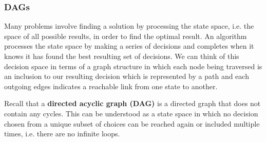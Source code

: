 \documentclass{article}
\begin{document}
       \subsubsection{DAGs}
    
    Many problems involve finding a solution by processing the state space, i.e. the space of all possible results, in order to find the optimal result. An algorithm processes the state space by making a series of decisions and completes when it knows it has found the best resulting set of decisions. We can think of this decision space in terms of a graph structure in which each node being traversed is an inclusion to our resulting decision which is represented by a path and each outgoing edges indicates a reachable link from one state to another. 
    
    Recall that a \textbf{directed acyclic graph (DAG)} is a directed graph that does not contain any cycles. This can be understood as a state space in which no decision chosen from a unique subset of choices can be reached again or included multiple times, i.e. there are no infinite loops.
    
\end{document}
